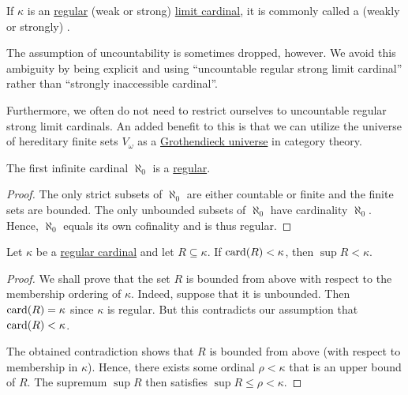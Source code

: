 \begin{remark}\label{rem:strongly_inaccessible_cardinal}
  If \( \kappa \) is an  \hyperref[def:regular_cardinal]{regular} (weak or strong) \hyperref[def:successor_and_limit_cardinal]{limit cardinal}, it is commonly called a (weakly or strongly) .

  The assumption of uncountability is sometimes dropped, however. We avoid this ambiguity by being explicit and using \enquote{uncountable regular strong limit cardinal} rather than \enquote{strongly inaccessible cardinal}.

  Furthermore, we often do not need to restrict ourselves to uncountable regular strong limit cardinals. An added benefit to this is that we can utilize the universe of hereditary finite sets \hyperref[def:universe_of_hereditary_finite_sets]{\( V_\omega \)} as a \hyperref[def:grothendieck_universe]{Grothendieck universe} in category theory.
\end{remark}

\begin{proposition}\label{thm:aleph_zero_is_regular}
  The first infinite cardinal \( \aleph_0 \) is a \hyperref[def:regular_cardinal]{regular}.
\end{proposition}
\begin{proof}
  The only strict subsets of \( \aleph_0 \) are either countable or finite and the finite sets are bounded. The only unbounded subsets of \( \aleph_0 \) have cardinality \( \aleph_0 \). Hence, \( \aleph_0 \) equals its own cofinality and is thus regular.
\end{proof}

\begin{lemma}\label{thm:regular_cardinal_stage_supremum_lemma}
  Let \( \kappa \) be a \hyperref[def:regular_cardinal]{regular cardinal} and let \( R \subseteq \kappa \). If \( \operatorname{card}(R) < \kappa \), then \( \sup R < \kappa \).
\end{lemma}
\begin{proof}
  We shall prove that the set \( R \) is bounded from above with respect to the membership ordering of \( \kappa \). Indeed, suppose that it is unbounded. Then \( \operatorname{card}(R) = \kappa \) since \( \kappa \) is regular. But this contradicts our assumption that \( \operatorname{card}(R) < \kappa \).

  The obtained contradiction shows that \( R \) is bounded from above (with respect to membership in \( \kappa \)). Hence, there exists some ordinal \( \rho < \kappa \) that is an upper bound of \( R \). The supremum \( \sup R \) then satisfies \( \sup R \leq \rho < \kappa \).
\end{proof}

